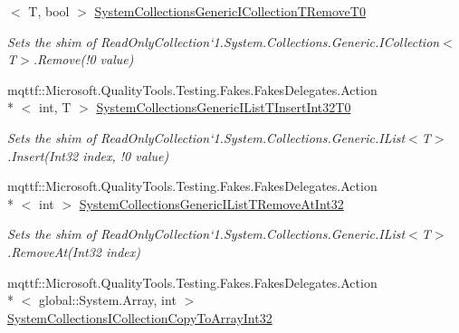 \begin{DoxyCompactItemize}
$<$ T, bool $>$ \hyperlink{class_system_1_1_collections_1_1_object_model_1_1_fakes_1_1_shim_read_only_collection_3_01_t_01_4_ab120df01e1643e234556fdcc22f2829b}{System\-Collections\-Generic\-I\-Collection\-T\-Remove\-T0}
\begin{DoxyCompactList}\small\item\em Sets the shim of Read\-Only\-Collection`1.System.\-Collections.\-Generic.\-I\-Collection$<$T$>$.Remove(!0 value)\end{DoxyCompactList}\item 
mqttf\-::\-Microsoft.\-Quality\-Tools.\-Testing.\-Fakes.\-Fakes\-Delegates.\-Action\\*
$<$ int, T $>$ \hyperlink{class_system_1_1_collections_1_1_object_model_1_1_fakes_1_1_shim_read_only_collection_3_01_t_01_4_abebbb3d182f215892592f750dbe1996b}{System\-Collections\-Generic\-I\-List\-T\-Insert\-Int32\-T0}
\begin{DoxyCompactList}\small\item\em Sets the shim of Read\-Only\-Collection`1.System.\-Collections.\-Generic.\-I\-List$<$T$>$.Insert(Int32 index, !0 value)\end{DoxyCompactList}\item 
mqttf\-::\-Microsoft.\-Quality\-Tools.\-Testing.\-Fakes.\-Fakes\-Delegates.\-Action\\*
$<$ int $>$ \hyperlink{class_system_1_1_collections_1_1_object_model_1_1_fakes_1_1_shim_read_only_collection_3_01_t_01_4_a3c787eaf1b7a8077a58914e7b9fc45c6}{System\-Collections\-Generic\-I\-List\-T\-Remove\-At\-Int32}
\begin{DoxyCompactList}\small\item\em Sets the shim of Read\-Only\-Collection`1.System.\-Collections.\-Generic.\-I\-List$<$T$>$.Remove\-At(\-Int32 index)\end{DoxyCompactList}\item 
mqttf\-::\-Microsoft.\-Quality\-Tools.\-Testing.\-Fakes.\-Fakes\-Delegates.\-Action\\*
$<$ global\-::\-System.\-Array, int $>$ \hyperlink{class_system_1_1_collections_1_1_object_model_1_1_fakes_1_1_shim_read_only_collection_3_01_t_01_4_a16f83503e1dd79a2e727da1ba5bbd67d}{System\-Collections\-I\-Collection\-Copy\-To\-Array\-Int32}

\end{DoxyCompactItemize}
